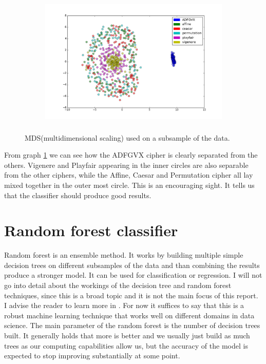 \documentclass[a4paper]{article}
\begin{document}
\begin{figure}[H]
    \centering
    \begin{subfigure}[h]{0.5\textwidth}
        \centering
        \includegraphics[height=2.5in]{img/mds_features.png}
    \end{subfigure}
    \caption{MDS(multidimensional scaling) used on a subsample of the data.}
    \label{fig:mds}
\end{figure}

From graph \ref{fig:mds} we can see how the ADFGVX cipher is clearly separated from the others. Vigenere and Playfair appearing in the inner circles are also separable from the other ciphers, while the Affine, Caesar and Permutation cipher all lay mixed together in the outer most circle. This is an encouraging sight. It tells us that the classifier should produce good results.

\section{Random forest classifier}
Random forest is an ensemble method. It works by building multiple simple decision trees on different subsamples of the data and than combining the results produce a stronger model. It can be used for classification or regression. I will not go into detail about the workings of the decision tree and random forest techniques, since this is a broad topic and it is not the main focus of this report. I advise the reader to learn more in \cite{breiman2001random}. For now it suffices to say that this is a robust machine learning technique that works well on different domains in data science. The main parameter of the random forest is the number of decision trees built. It generally holds that more is better and we usually just build as much trees as our computing capabilities allow us, but the accuracy of the model is expected to stop improving substantially at some point.
\end{document}
